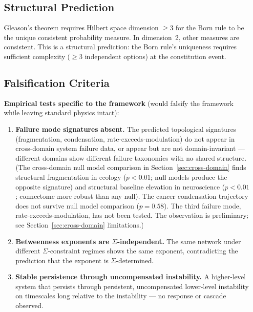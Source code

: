 \documentclass[12pt,a4paper]{article}
\begin{document}
\subsection{Structural Prediction}
\label{sec:structural-prediction}

Gleason's theorem requires Hilbert space dimension $\geq 3$ for the Born rule to be the unique consistent probability measure. In dimension~2, other measures are consistent. This is a structural prediction: the Born rule's uniqueness requires sufficient complexity ($\geq 3$ independent options) at the constitution event.

\subsection{Falsification Criteria}
\label{sec:falsification}

\textbf{Empirical tests specific to the framework} (would falsify the framework while leaving standard physics intact):

\begin{enumerate}
  \item \textbf{Failure mode signatures absent.} The predicted topological signatures (fragmentation, condensation, rate-exceeds-modulation) do not appear in cross-domain system failure data, or appear but are not domain-invariant --- different domains show different failure taxonomies with no shared structure. (The cross-domain null model comparison in Section~\ref{sec:cross-domain} finds structural fragmentation in ecology ($p < 0.01$; null models produce the opposite signature) and structural baseline elevation in neuroscience ($p < 0.01$; connectome more robust than any null). The cancer condensation trajectory does not survive null model comparison ($p = 0.58$). The third failure mode, rate-exceeds-modulation, has not been tested. The observation is preliminary; see Section~\ref{sec:cross-domain} limitations.)
  \item \textbf{Betweenness exponents are $\Sigma$-independent.} The same network under different $\Sigma$-constraint regimes shows the same exponent, contradicting the prediction that the exponent is $\Sigma$-determined.
  \item \textbf{Stable persistence through uncompensated instability.} A higher-level system that persists through persistent, uncompensated lower-level instability on timescales long relative to the instability --- no response or cascade observed.
\end{enumerate}
\end{document}
